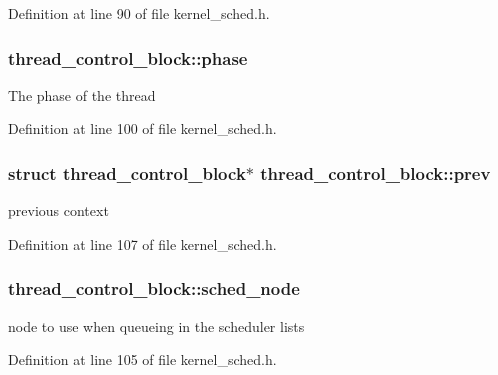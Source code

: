 Definition at line 90 of file kernel\+\_\+sched.\+h.

\subsubsection[{\texorpdfstring{phase}{phase}}]{ thread\+\_\+control\+\_\+block\+::phase}\hypertarget{structthread__control__block_aa7e8e6a00c5f9f25210a49589ad818f8}{}\label{structthread__control__block_aa7e8e6a00c5f9f25210a49589ad818f8}
The phase of the thread 

Definition at line 100 of file kernel\+\_\+sched.\+h.

\subsubsection[{\texorpdfstring{prev}{prev}}]{\setlength{\rightskip}{0pt plus 5cm}struct {\bf thread\+\_\+control\+\_\+block}$\ast$ thread\+\_\+control\+\_\+block\+::prev}\hypertarget{structthread__control__block_a605a6e9bb8154b658ee72e193599d180}{}\label{structthread__control__block_a605a6e9bb8154b658ee72e193599d180}
previous context 

Definition at line 107 of file kernel\+\_\+sched.\+h.

\subsubsection[{\texorpdfstring{sched\+\_\+node}{sched_node}}]{ thread\+\_\+control\+\_\+block\+::sched\+\_\+node}\hypertarget{structthread__control__block_add433b079e04053fe70fdd2b92e1d6ad}{}\label{structthread__control__block_add433b079e04053fe70fdd2b92e1d6ad}
node to use when queueing in the scheduler lists 

Definition at line 105 of file kernel\+\_\+sched.\+h.


